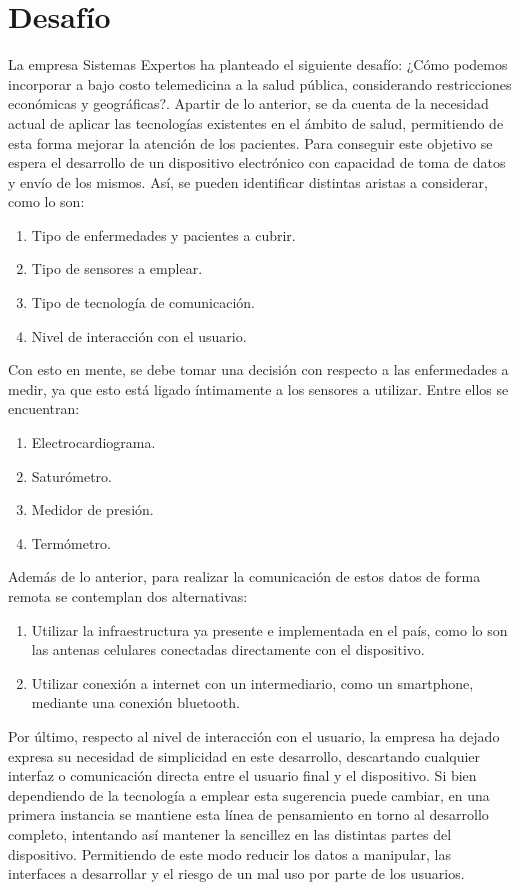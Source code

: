 \section{Desafío}
La empresa Sistemas Expertos ha planteado el siguiente desafío: ¿Cómo podemos incorporar a bajo costo telemedicina a la salud pública, considerando restricciones económicas y geográficas?. \newline
Apartir de lo anterior, se da cuenta de la necesidad actual de aplicar las tecnologías existentes en el ámbito de salud, permitiendo de esta forma mejorar la atención de los pacientes. Para conseguir este objetivo se espera el desarrollo de un dispositivo electrónico con capacidad de toma de datos y envío de los mismos. Así, se pueden identificar distintas aristas a considerar, como lo son: 
\begin{enumerate}
	\item 
	Tipo de enfermedades y pacientes a cubrir.
	\item 
	Tipo de sensores a emplear.
	\item 
	Tipo de tecnología de comunicación.
	\item 
	Nivel de interacción con el usuario.
\end{enumerate}

Con esto en mente, se debe tomar una decisión con respecto a las enfermedades a medir, ya que esto está ligado íntimamente a los sensores a utilizar. Entre ellos se encuentran:
\begin{enumerate}
	\item 
	Electrocardiograma.
	\item 
	Saturómetro.
	\item 
	Medidor de presión.
	\item 
	Termómetro.
\end{enumerate}

Además de lo anterior, para realizar la comunicación de estos datos de forma remota se contemplan dos alternativas:
\begin{enumerate}
	\item 
	Utilizar la infraestructura ya presente e implementada en el país, como lo son las antenas celulares conectadas directamente con el dispositivo.
	\item 
	Utilizar conexión a internet con un intermediario, como un smartphone, mediante una conexión bluetooth.
\end{enumerate}

Por último, respecto al nivel de interacción con el usuario, la empresa ha dejado expresa su necesidad de simplicidad en este desarrollo, descartando cualquier interfaz o comunicación directa entre el usuario final y el dispositivo. Si bien dependiendo de la tecnología a emplear esta sugerencia puede cambiar, en una primera instancia se mantiene esta línea de pensamiento en torno al desarrollo completo, intentando así mantener la sencillez en las distintas partes del dispositivo. Permitiendo de este modo reducir los datos a manipular, las interfaces a desarrollar y el riesgo de un mal uso por parte de los usuarios.